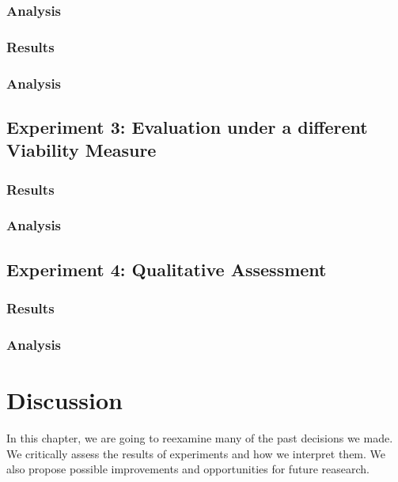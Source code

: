 \documentclass[12pt,a4paper]{report}
\begin{document}
\subsection{Analysis}

\subsection{Results}

\subsection{Analysis}



\section{Experiment 3: Evaluation under a different Viability Measure}
\subsection{Results}

\subsection{Analysis}


\section{Experiment 4: Qualitative Assessment}
\subsection{Results}

\subsection{Analysis}



\chapter{Discussion}
\label{sec:dicussion}
In this chapter, we are going to reexamine many of the past decisions we made. We critically assess the results of experiments and how we interpret them. We also propose possible improvements and opportunities for future reasearch.
\end{document}
